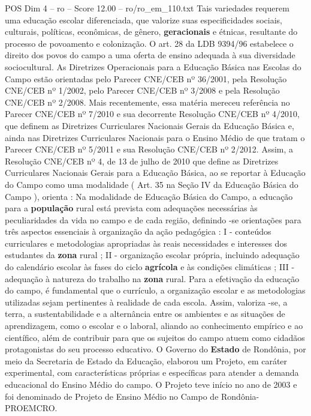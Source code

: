 \begin{textsample}{POS Dim 4 – ro – Score 12.00 – ro/ro\_em\_110.txt}
Tais variedades requerem uma educação escolar diferenciada, que valorize suas especificidades sociais, culturais, políticas, econômicas, de gênero, \textbf{geracionais} e étnicas, resultante do processo de povoamento e colonização.
O art. 28 da LDB 9394/96 estabelece o direito dos povos do campo a uma oferta de ensino adequada à sua diversidade sociocultural.
As Diretrizes Operacionais para a Educação Básica nas Escolas do Campo estão orientadas pelo Parecer CNE/CEB nº 36/2001, pela Resolução CNE/CEB nº 1/2002, pelo Parecer CNE/CEB nº 3/2008 e pela Resolução CNE/CEB nº 2/2008.
Mais recentemente, essa matéria mereceu referência no Parecer CNE/CEB nº 7/2010 e sua decorrente Resolução CNE/CEB nº 4/2010, que definem as Diretrizes Curriculares Nacionais Gerais da Educação Básica e, ainda nas Diretrizes Curriculares Nacionais para o Ensino Médio de que tratam o Parecer CNE/CEB nº 5/2011 e sua Resolução CNE/CEB nº 2/2012.
Assim, a Resolução CNE/CEB nº 4, de 13 de julho de 2010 que define as Diretrizes Curriculares Nacionais Gerais para a Educação Básica, ao se reportar à Educação do Campo como uma modalidade ( Art. 35 na Seção IV da Educação Básica do Campo ), orienta : Na modalidade de Educação Básica do Campo, a educação para a \textbf{população} rural está prevista com adequações necessárias às peculiaridades da vida no campo e de cada região, definindo -se orientações para três aspectos essenciais à organização da ação pedagógica : I - conteúdos curriculares e metodologias apropriadas às reais necessidades e interesses dos estudantes da \textbf{zona} rural ; II - organização escolar própria, incluindo adequação do calendário escolar às fases do ciclo \textbf{agrícola} e às condições climáticas ; III - adequação à natureza do trabalho na \textbf{zona} rural.
Para a efetivação da educação do campo, é fundamental que o currículo, a organização escolar e as metodologias utilizadas sejam pertinentes à realidade de cada escola.
Assim, valoriza -se, a terra, a sustentabilidade e a alternância entre os ambientes e as situações de aprendizagem, como o escolar e o laboral, aliando ao conhecimento empírico e ao científico, além de contribuir para que os sujeitos do campo atuem como cidadãos protagonistas do seu processo educativo.
O Governo do \textbf{Estado} de Rondônia, por meio da Secretaria de Estado da Educação, elaborou um Projeto, em caráter experimental, com características próprias e específicas para atender a demanda educacional do Ensino Médio do campo.
O Projeto teve início no ano de 2003 e foi denominado de Projeto de Ensino Médio no Campo de Rondônia- PROEMCRO.

\end{textsample}
